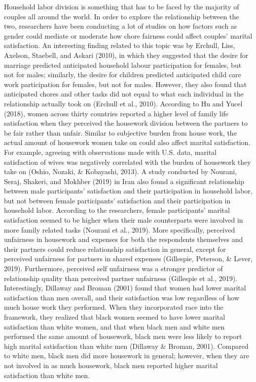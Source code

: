 \documentclass[
  english,
  man]{apa6}
\begin{document}
Household labor division is something that has to be faced by the majority of couples all around the world. In order to explore the relationship between the two, researchers have been conducting a lot of studies on how factors such as gender could mediate or moderate how chore fairness could affect couples' marital satisfaction. An interesting finding related to this topic was by Erchull, Liss, Axelson, Staebell, and Askari (2010), in which they suggested that the desire for marriage predicted anticipated household labour participation for females, but not for males; similarly, the desire for children predicted anticipated child care work participation for females, but not for males. However, they also found that anticipated chores and other tasks did not equal to what each individual in the relationship actually took on (Erchull et al., 2010). According to Hu and Yucel (2018), women across thirty countries reported a higher level of family life satisfaction when they perceived the housework division between the partners to be fair rather than unfair. Similar to subjective burden from house work, the actual amount of housework women take on could also affect marital satisfaction. For example, agreeing with observations made with U.S. data, marital satisfaction of wives was negatively correlated with the burden of housework they take on (Oshio, Nozaki, \& Kobayashi, 2013). A study conducted by Nourani, Seraj, Shakeri, and Mokhber (2019) in Iran also found a significant relationship between male participants' satisfaction and their participation in household labor, but not between female participants' satisfaction and their participation in household labor. According to the researchers, female participants' marital satisfaction seemed to be higher when their male counterparts were involved in more family related tasks (Nourani et al., 2019). More specifically, perceived unfairness in housework and expenses for both the respondents themselves and their partners could reduce relationship satisfaction in general, except for perceived unfairness for partners in shared expenses (Gillespie, Peterson, \& Lever, 2019). Furthermore, perceived self unfairness was a stronger predictor of relationship quality than perceived partner unfairness (Gillespie et al., 2019). Interestingly, Dillaway and Broman (2001) found that women had lower marital satisfaction than men overall, and their satisfaction was low regardless of how much house work they performed. When they incorporated race into the framework, they realized that black women seemed to have lower marital satisfaction than white women, and that when black men and white men performed the same amount of housework, black men were less likely to report high marital satisfaction than white men (Dillaway \& Broman, 2001). Compared to white men, black men did more housework in general; however, when they are not involved in as much housework, black men reported higher marital satisfaction than white men.
\end{document}
